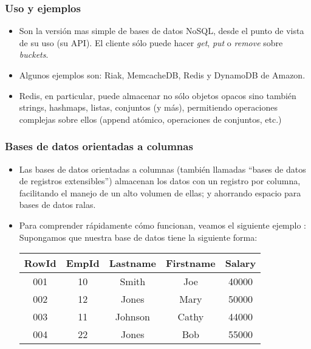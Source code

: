 \begin{frame}
\frametitle{Uso y ejemplos}
\begin{itemize}
	\item	Son la versión mas simple de bases de datos NoSQL,
		desde el punto de vista de su uso (su API). El cliente
		sólo puede hacer \textit{get}, \textit{put} o
		\textit{remove} sobre \textit{buckets}.
		\pause

	\item	Algunos ejemplos son: Riak, MemcacheDB, Redis y
		DynamoDB de Amazon.
		\pause

	\item	Redis, en particular, puede almacenar no sólo
		objetos opacos sino también strings, hashmaps, listas,
		conjuntos (y más), permitiendo operaciones complejas
		sobre ellos (append atómico, operaciones de conjuntos, etc.)
\end{itemize}

\end{frame}
\begin{frame}
\frametitle{Bases de datos orientadas a columnas}
\begin{itemize}
\item	Las bases de datos orientadas a columnas (también llamadas ``bases de datos de registros extensibles'') almacenan los datos con un registro por columna, facilitando el manejo de un alto volumen de ellas; y ahorrando espacio para bases de datos ralas. \pause
\item	Para comprender rápidamente cómo funcionan, veamos el siguiente ejemplo : \pause \\
		Supongamos que nuestra base de datos tiene la siguiente forma: \\
		\begin{tabular}{|c|c|c|c|c|}
		\hline
		RowId	&	EmpId	&	Lastname	&	Firstname	&	Salary \\ \hline
		001		&	10		&	Smith		&	Joe			&	40000 \\ \hline
		002		&	12		&	Jones		&	Mary		&	50000 \\ \hline
		003		&	11		&	Johnson		&	Cathy		&	44000  \\ \hline
		004		&	22		&	Jones		&	Bob			&	55000  \\ \hline
		\end{tabular}
\end{itemize}
\end{frame}

